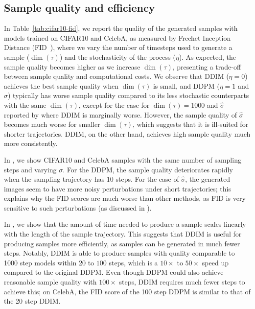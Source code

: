 \subsection{Sample quality and efficiency}
In Table~\ref{tab:cifar10-fid}, we report the quality of the generated samples with models trained on CIFAR10 and CelebA, as measured by Frechet  Inception Distance (FID~\citep{heusel2017gans}), where we vary the number of timesteps used to generate a sample ($\dim(\tau)$) and the stochasticity of the process ($\eta$).
As expected, the sample quality becomes higher as we increase $\dim(\tau)$, presenting a trade-off between sample quality and computational costs.
We observe that DDIM ($\eta = 0$) achieves the best sample quality when $\dim(\tau)$ is small, and DDPM ($\eta = 1$ and $\hat{\sigma}$) typically has worse sample quality compared to its less stochastic counterparts with the same $\dim(\tau)$, except for the case for $\dim(\tau) = 1000$ and $\hat{\sigma}$ reported by \citet{ho2020denoising} where DDIM is marginally worse. However, the sample quality of $\hat{\sigma}$ becomes much worse for smaller $\dim(\tau)$, which suggests that it is ill-suited for shorter trajectories. DDIM, on the other hand, achieves high sample quality much more consistently. 

In , we show CIFAR10 and CelebA samples with the same number of sampling steps and varying $\sigma$. For the DDPM, the sample quality deteriorates rapidly when the sampling trajectory has 10 steps. For the case of $\hat{\sigma}$, the generated images seem to have more noisy perturbations under short trajectories; this explains why the FID scores are much worse than other methods, as FID is very sensitive to such perturbations (as discussed in \citet{Jolicoeur-Martineau2020adversarial}). 

In , we show that the amount of time needed to produce a sample scales linearly with the length of the sample trajectory. %
This suggests that DDIM is useful for producing samples more efficiently, as samples can be generated in much fewer steps. Notably, DDIM is able to produce samples with quality comparable to 1000 step models within $20$ to $100$ steps, which is a $10\times$ to $50\times$ speed up compared to the original DDPM. Even though DDPM could also achieve reasonable sample quality with $100\times$ steps, DDIM requires much fewer steps to achieve this; on CelebA, the FID score of the 100 step DDPM is similar to that of the 20 step DDIM. 

